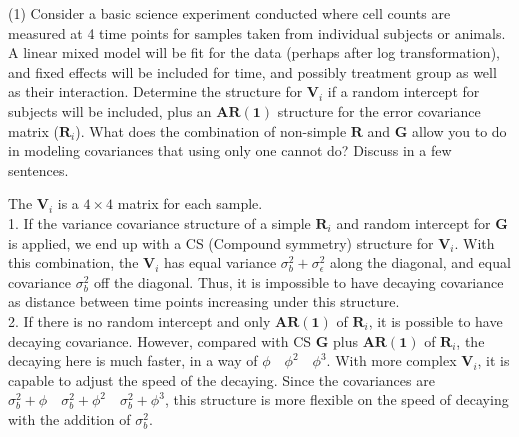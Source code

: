 \documentclass[12pt, utf8]{article}
\begin{document}
\newcommand\scalemath[2]{\scalebox{#1}{\mbox{\ensuremath{\displaystyle #2}}}}


\newenvironment{problem}{\begin{framed}\begin{bfseries}}{\end{bfseries}\end{framed}\vspace{14pt}}


\begin{problem}
(1) Consider a basic science experiment conducted where cell counts are measured at 4 time points for samples taken from individual subjects or animals.  A linear mixed model will be fit for the data (perhaps after log transformation), and fixed effects will be included for time, and possibly treatment group as well as their interaction. Determine the structure for $\boldsymbol{V}_i$ if a random intercept for subjects will be included, plus an $\boldsymbol{AR(1)}$ structure for the error covariance matrix ($\boldsymbol{R}_i$).  What does the combination of non-simple $\boldsymbol{R}$ and $\boldsymbol{G}$ allow you to do in modeling covariances that using only one cannot do?  Discuss in a few sentences.
\end{problem}

The $\boldsymbol{V}_i$ is a $4 \times 4$ matrix for each sample.\\
1. If the variance covariance structure of a simple $\boldsymbol{R}_i$ and random intercept for $\boldsymbol{G}$ is applied, we end up with a CS (Compound symmetry) structure for $\boldsymbol{V}_i$. With this combination, the $\boldsymbol{V}_i$ has equal variance $\sigma^2_b + \sigma^2_{\epsilon}$ along the diagonal, and equal covariance $ \sigma^2_b$ off the diagonal. Thus, it is impossible to have decaying covariance as distance between time points increasing under this structure. \\
2. If there is no random intercept and only $\boldsymbol{AR(1)}$ of $\boldsymbol{R}_i$, it is possible to have decaying covariance. However, compared with CS $\boldsymbol{G}$ plus $\boldsymbol{AR(1)}$ of $\boldsymbol{R}_i$, the decaying here is much faster, in a way of $ \phi \quad \phi^2 \quad \phi^3$. With more complex $\boldsymbol{V}_i$, it is capable to adjust the speed of the decaying. Since the covariances are $  \sigma^2_{b}+\phi \quad \sigma^2_{b}+\phi^2 \quad \sigma^2_{b}+\phi^3$, this structure is more flexible on the speed of decaying with the addition of $  \sigma^2_{b}$. 
\end{document}
